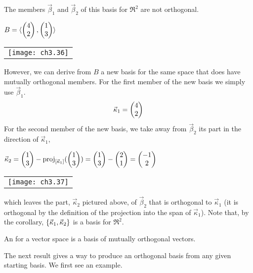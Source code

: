 \begin{example}
The members $\vec{\beta}_1$ and $\vec{\beta}_2$ of this basis for $\Re^2$
are not orthogonal.
\begin{center}  \small
  $\displaystyle 
      B=\sequence{
            \colvec{4 \\ 2},
            \colvec{1 \\ 3} }$
  \qquad %
  \begin{tabular}{@{}c@{}}\texttt{[image: ch3.36]}\end{tabular}
\end{center}
However, we can derive from $B$
a new basis for the same space that does have mutually orthogonal members.
For the first member of the new basis we simply use $\vec{\beta}_1$.
\begin{equation*}
  \vec{\kappa}_1=\colvec{4 \\ 2}
\end{equation*}
For the second member of the new basis,  
we take away from $\vec{\beta}_2$ its part in the direction of
$\vec{\kappa}_1$, 
\begin{center}  \small
   $\displaystyle \vec{\kappa}_2=\colvec{1 \\ 3}
    -\proj{\colvec{1 \\ 3}}{\scriptstyle\spanof{\vec{\kappa}_1}}
    =\colvec{1 \\ 3}-\colvec{2 \\ 1}=\colvec{-1 \\ 2}$
   \qquad
  \begin{tabular}{@{}c@{}}\texttt{[image: ch3.37]}\end{tabular}
\end{center} 
which leaves the part, $\vec{\kappa}_2$ pictured above,
of $\vec{\beta}_2$ that is orthogonal to $\vec{\kappa}_1$
(it is orthogonal by the definition of the projection into the span of 
$\vec{\kappa}_1$).
Note that, by the corollary, $\set{\vec{\kappa}_1,\vec{\kappa}_2}$ 
is a basis for $\Re^2$.
\end{example}

\begin{definition}
An %
for a vector space is a basis of mutually orthogonal vectors.
\end{definition}

The next result gives a way to produce an orthogonal basis 
from any given starting basis.
We first see an example.

